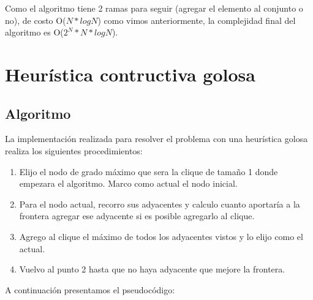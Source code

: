 \documentclass[a4paper, 10pt, twoside]{article}
\begin{document}
Como el algoritmo tiene 2 ramas para seguir (agregar el elemento al conjunto o no), de costo O($N * log N$) como vimos anteriormente, la complejidad final del algoritmo es O($2^N * N * log N$).



\newpage

\section{Heurística contructiva golosa}
\subsection{Algoritmo}
La implementación realizada para resolver el problema con una heurística golosa realiza los siguientes procedimientos:
\begin{enumerate}
\item Elijo el nodo de grado máximo que sera la clique de tamaño 1 donde empezara el algoritmo. Marco como actual el nodo inicial.
\item Para el nodo actual, recorro sus adyacentes y calculo cuanto aportaría a la frontera agregar ese adyacente si es posible agregarlo al clique.
\item Agrego al clique el máximo de todos los adyacentes vistos y lo elijo como el actual.
\item Vuelvo al punto 2 hasta que no haya adyacente que mejore la frontera.
\end{enumerate}

A continuación presentamos el pseudocódigo:
\end{document}
